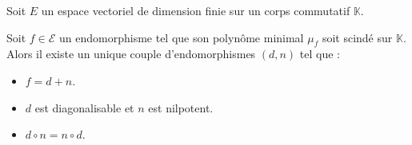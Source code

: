 





	Soit $E$ un espace vectoriel de dimension finie sur un corps commutatif $\mathbb{K}$.

	\begin{theorem}
		Soit $f \in \mathcal{E}$ un endomorphisme tel que son polynôme minimal $\mu_f$ soit scindé sur $\mathbb{K}$. Alors il existe un unique couple d'endomorphismes $(d, n)$ tel que :
		\begin{itemize}
			\item $f = d + n$.
			\item $d$ est diagonalisable et $n$ est nilpotent.
			\item $d \circ n = n \circ d$.
		\end{itemize}
	\end{theorem}

